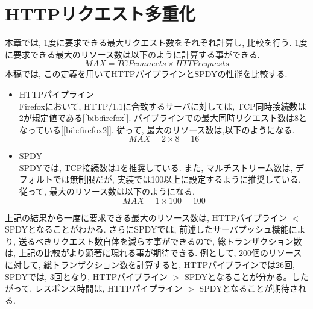 \documentclass[twocolumn]{jsarticle}
\begin{document}
\section{HTTPリクエスト多重化}
本章では, 1度に要求できる最大リクエスト数をそれぞれ計算し, 比較を行う.
1度に要求できる最大のリソース数は以下のように計算する事ができる.
\begin{equation}
MAX= TCP connects \times HTTP requests
\end{equation}
本稿では, この定義を用いてHTTPパイプラインとSPDYの性能を比較する.
\begin{itemize}
  \item HTTPパイプライン \\
Firefoxにおいて, HTTP/1.1に合致するサーバに対しては, TCP同時接続数は2が規定値である[\ref{bib:firefox}].
パイプラインでの最大同時リクエスト数は8となっている[\ref{bib:firefox2}].
従って, 最大のリソース数は,以下のようになる.
\begin{equation}
MAX = 2 \times 8 = 16 \nonumber
\end{equation}
  \item SPDY \\
SPDYでは, TCP接続数は1を推奨している.
また, マルチストリーム数は, デフォルトでは無制限だが, 実装では100以上に設定するように推奨している.
従って, 最大のリソース数は以下のようになる.
\begin{equation}
MAX= 1 \times 100 = 100 \nonumber
\end{equation}
\end{itemize}
上記の結果から一度に要求できる最大のリソース数は, HTTPパイプライン $<$ SPDYとなることがわかる.
さらにSPDYでは, 前述したサーバプッシュ機能により, 送るべきリクエスト数自体を減らす事ができるので,
総トランザクション数は, 上記の比較がより顕著に現れる事が期待できる.
例として, 200個のリソースに対して, 総トランザクション数を計算すると, HTTPパイプラインでは26回, SPDYでは, 3回となり,
HTTPパイプライン $>$ SPDYとなることが分かる。したがって, レスポンス時間は, HTTPパイプライン $>$ SPDYとなることが期待される.
\end{document}

